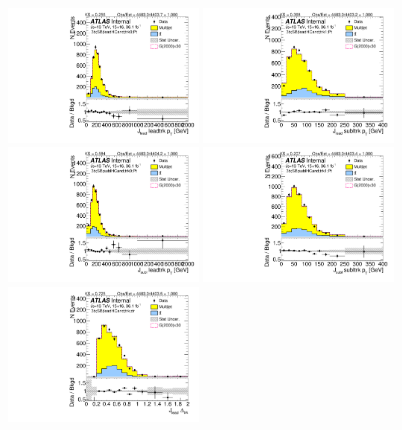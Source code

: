 \begin{figure}[htbp!]
\begin{center}
\includegraphics[width=0.45\textwidth,angle=-90]{figures/boosted/Sideband/b77_ThreeTag_Sideband_leadHCand_trk0_Pt.pdf}
\includegraphics[width=0.45\textwidth,angle=-90]{figures/boosted/Sideband/b77_ThreeTag_Sideband_leadHCand_trk1_Pt.pdf}\\
\includegraphics[width=0.45\textwidth,angle=-90]{figures/boosted/Sideband/b77_ThreeTag_Sideband_sublHCand_trk0_Pt.pdf}
\includegraphics[width=0.45\textwidth,angle=-90]{figures/boosted/Sideband/b77_ThreeTag_Sideband_sublHCand_trk1_Pt.pdf}\\
\includegraphics[width=0.45\textwidth,angle=-90]{figures/boosted/Sideband/b77_ThreeTag_Sideband_leadHCand_trk_dr.pdf}

\end{center}
\end{figure}

